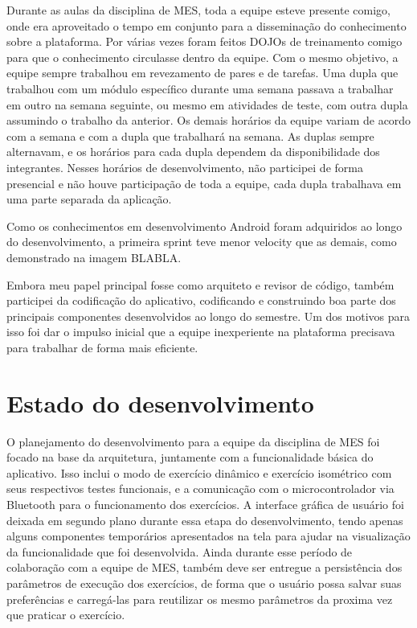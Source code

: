 Durante as aulas da disciplina de MES, toda a equipe esteve presente comigo, onde era aproveitado o tempo em conjunto para a disseminação do conhecimento sobre a plataforma. Por várias vezes foram feitos DOJOs de treinamento comigo para que o conhecimento circulasse dentro da equipe. Com o mesmo objetivo, a equipe sempre trabalhou em revezamento de pares e de tarefas. Uma dupla que trabalhou com um módulo específico durante uma semana passava a trabalhar em outro na semana seguinte, ou mesmo em atividades de teste, com outra dupla assumindo o trabalho da anterior. Os demais horários da equipe variam de acordo com a semana e com a dupla que trabalhará na semana. As duplas sempre alternavam, e os horários para cada dupla dependem da disponibilidade dos integrantes. Nesses horários de desenvolvimento, não participei de forma presencial e não houve participação de toda a equipe, cada dupla trabalhava em uma parte separada da aplicação.

Como os conhecimentos em desenvolvimento Android foram adquiridos ao longo do desenvolvimento, a primeira sprint teve menor velocity que as demais, como demonstrado na imagem BLABLA.

Embora meu papel principal fosse como arquiteto e revisor de código, também participei da codificação do aplicativo, codificando e construindo boa parte dos principais componentes desenvolvidos ao longo do semestre. Um dos motivos para isso foi dar o impulso inicial que a equipe inexperiente na plataforma precisava para trabalhar de forma mais eficiente.

\section{Estado do desenvolvimento}

O planejamento do desenvolvimento para a equipe da disciplina de MES foi focado na base da arquitetura, juntamente com a funcionalidade básica do aplicativo. Isso inclui o modo de exercício dinâmico e exercício isométrico com seus respectivos testes funcionais, e a comunicação com o microcontrolador via Bluetooth para o funcionamento dos exercícios. A interface gráfica de usuário foi deixada em segundo plano durante essa etapa do desenvolvimento, tendo apenas alguns componentes temporários apresentados na tela para ajudar na visualização da funcionalidade que foi desenvolvida. Ainda durante esse período de colaboração com a equipe de MES, também deve ser entregue a persistência dos parâmetros de execução dos exercícios, de forma que o usuário possa salvar suas preferências e carregá-las para reutilizar os mesmo parâmetros da proxima vez que praticar o exercício.

